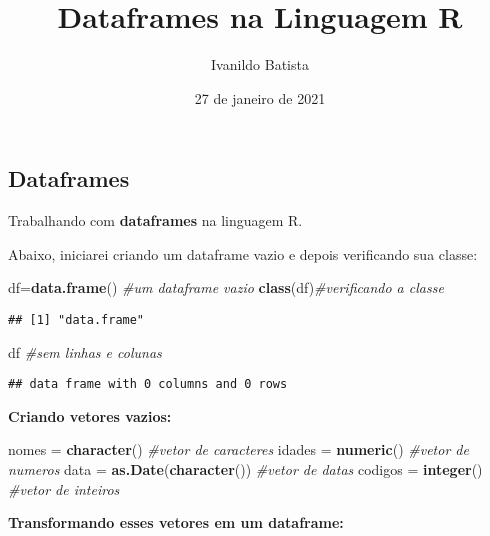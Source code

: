 \documentclass[]{article}
\title{Dataframes na Linguagem R}
\author{Ivanildo Batista}
\date{27 de janeiro de 2021}
\newenvironment{Shaded}{\begin{snugshade}}{\end{snugshade}}
\newcommand{\KeywordTok}[1]{\textcolor[rgb]{0.13,0.29,0.53}{\textbf{#1}}}
\newcommand{\StringTok}[1]{\textcolor[rgb]{0.31,0.60,0.02}{#1}}
\newcommand{\CommentTok}[1]{\textcolor[rgb]{0.56,0.35,0.01}{\textit{#1}}}
\newcommand{\NormalTok}[1]{#1}
\begin{document}
\maketitle

\subsection{Dataframes}\label{dataframes}

Trabalhando com \textbf{dataframes} na linguagem R.

Abaixo, iniciarei criando um dataframe vazio e depois verificando sua
classe:

\begin{Shaded}
\begin{Highlighting}[]
\NormalTok{df=}\KeywordTok{data.frame}\NormalTok{() }\CommentTok{#um dataframe vazio}
\KeywordTok{class}\NormalTok{(df)}\CommentTok{#verificando a classe}
\end{Highlighting}
\end{Shaded}

\begin{verbatim}
## [1] "data.frame"
\end{verbatim}

\begin{Shaded}
\begin{Highlighting}[]
\NormalTok{df }\CommentTok{#sem linhas e colunas}
\end{Highlighting}
\end{Shaded}

\begin{verbatim}
## data frame with 0 columns and 0 rows
\end{verbatim}

\textbf{Criando vetores vazios:}

\begin{Shaded}
\begin{Highlighting}[]
\NormalTok{nomes =}\StringTok{ }\KeywordTok{character}\NormalTok{() }\CommentTok{#vetor de caracteres}
\NormalTok{idades =}\StringTok{ }\KeywordTok{numeric}\NormalTok{() }\CommentTok{#vetor de numeros}
\NormalTok{data =}\StringTok{ }\KeywordTok{as.Date}\NormalTok{(}\KeywordTok{character}\NormalTok{()) }\CommentTok{#vetor de datas}
\NormalTok{codigos =}\StringTok{ }\KeywordTok{integer}\NormalTok{() }\CommentTok{#vetor de inteiros}
\end{Highlighting}
\end{Shaded}

\textbf{Transformando esses vetores em um dataframe:}
\end{document}
